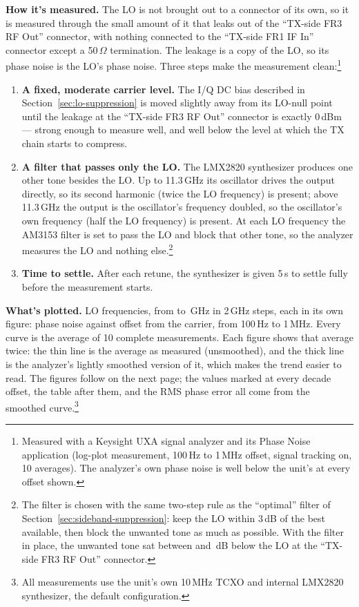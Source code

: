 \textbf{How it's measured.} The LO is not brought out to a connector of its own, so it is measured through the
small amount of it that leaks out of the ``TX-side FR3 RF Out'' connector, with nothing connected to the
``TX-side FR1 IF In'' connector except a 50\,$\Omega$ termination. The leakage is a copy of the LO, so its
phase noise is the LO's phase noise. Three steps make the measurement clean:\footnote{Measured with a Keysight
UXA signal analyzer and its Phase Noise application (log-plot measurement, 100\,Hz to 1\,MHz offset, signal
tracking on, 10 averages). The analyzer's own phase noise is well below the unit's at every offset shown.}
\begingroup\setlength{\leftmargini}{2.2em}\setlength{\topsep}{0.4em}%
\begin{enumerate}\setlength{\itemsep}{0.4em}\setlength{\parsep}{0pt}
  \item \textbf{A fixed, moderate carrier level.} The I/Q DC bias described in Section~\ref{sec:lo-suppression}
        is moved slightly away from its LO-null point until the leakage at the ``TX-side FR3 RF Out'' connector
        is exactly 0\,dBm --- strong enough to measure well, and well below the level at which the TX chain
        starts to compress.
  \item \textbf{A filter that passes only the LO.} The LMX2820 synthesizer produces one other tone besides the
        LO. Up to 11.3\,GHz its oscillator drives the output directly, so its second harmonic (twice the LO
        frequency) is present; above 11.3\,GHz the output is the oscillator's frequency doubled, so the
        oscillator's own frequency (half the LO frequency) is present. At each LO frequency the AM3153 filter
        is set to pass the LO and block that other tone, so the analyzer measures the LO and nothing
        else.\footnote{The filter is chosen with the same two-step rule as the ``optimal'' filter of
        Section~\ref{sec:sideband-suppression}: keep the LO within 3\,dB of the best available, then block the
        unwanted tone as much as possible. With the filter in place, the unwanted tone sat between
        \pnUnwantedMin{} and \pnUnwantedMax\,dB below the LO at the ``TX-side FR3 RF Out'' connector.}
  \item \textbf{Time to settle.} After each retune, the synthesizer is given 5\,s to settle fully before the
        measurement starts.
\end{enumerate}
\endgroup

\textbf{What's plotted.} \pnCount{} LO frequencies, from \pnLoLow{} to \pnLoHigh\,GHz in 2\,GHz steps, each in
its own figure: phase noise against offset from the carrier, from 100\,Hz to 1\,MHz. Every curve is the average of
10 complete measurements. Each figure shows that average twice: the thin line is the average as measured
(unsmoothed), and the thick line is the analyzer's lightly smoothed version of it, which makes the trend easier
to read. The figures follow on the next page; the values marked at every decade offset, the table after them, and
the RMS phase error all come from the smoothed curve.\footnote{All measurements use the unit's own
10\,MHz TCXO and internal LMX2820 synthesizer, the default configuration.}

